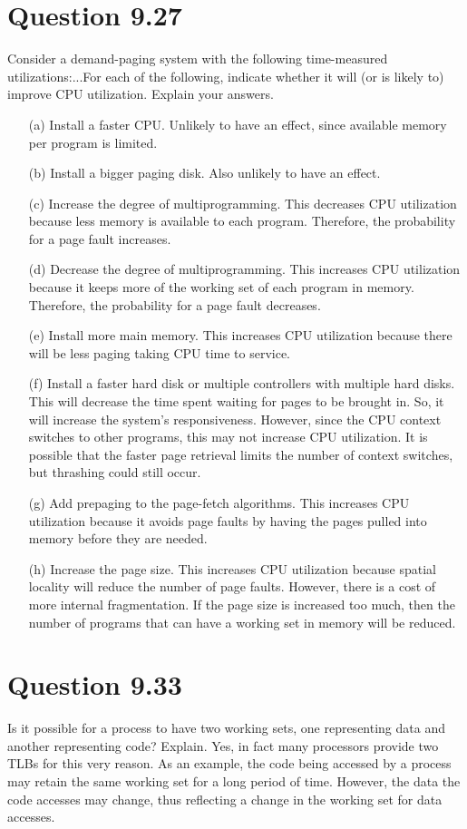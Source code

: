 \documentclass[12pt]{article}
\begin{document}
\section*{Question 9.27}{\color{blue}Consider a demand-paging system with the following time-measured utilizations:...For each of the following, indicate whether it will (or is likely to) improve CPU utilization. Explain your answers.
\begin{enumerate}
\item[(a)]Install a faster CPU. {\color{black}Unlikely to have an effect, since available memory per program is limited. 
}
\item[(b)]Install a bigger paging disk. {\color{black}Also unlikely to have an effect.
}
\item[(c)]Increase the degree of multiprogramming. {\color{black}This decreases CPU utilization because less memory is available to each program. Therefore, the probability for a page fault increases.
}
\item[(d)]Decrease the degree of multiprogramming. {\color{black}This increases CPU utilization because it keeps more of the working set of each program in memory. Therefore, the probability for a page fault decreases.
}
\item[(e)]Install more main memory. {\color{black}This increases CPU utilization because there will be less paging taking CPU time to service.
}
\item[(f)]Install a faster hard disk or multiple controllers with multiple hard disks. {\color{black}This will decrease the time spent waiting for pages to be brought in. So, it will increase the system's responsiveness. However, since the CPU context switches to other programs, this may not increase CPU utilization. It is possible that the faster page retrieval limits the number of context switches, but thrashing could still occur. 
}
\item[(g)]Add prepaging to the page-fetch algorithms. {\color{black}This increases CPU utilization because it avoids page faults by having the pages pulled into memory before they are needed.
}
\item[(h)]Increase the page size. {\color{black}This increases CPU utilization because spatial locality will reduce the number of page faults. However, there is a cost of more internal fragmentation. If the page size is increased too much, then the number of programs that can have a working set in memory will be reduced.
}
\end{enumerate}

}

\section*{Question 9.33}{\color{blue}Is it possible for a process to have two working sets, one representing data and another representing code? Explain.} Yes, in fact many processors provide two TLBs for this very reason. As an example, the code being accessed by a process may retain the same working set for a long period of time. However, the data the code accesses may change, thus reflecting a change in the working set for data accesses.
\end{document}
